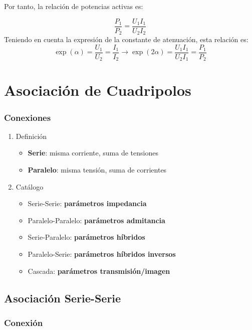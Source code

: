 Por tanto, la relación de potencias activas es:

\[
\frac{P_1}{P_2} = \frac{U_1 I_1}{U_2 I_2}
\]
Teniendo en cuenta la expresión de la constante de atenuación, esta relación es:
\[
    \exp(\alpha) = \frac{U_1}{U_2} = \frac{I_1}{I_2} \rightarrow \boxed{\exp(2\alpha) = \frac{U_1 I_1}{U_2 I_1} = \frac{P_1}{P_2}}
\]

\section{Asociación de Cuadripolos}
\label{sec:org69d0c87}

\subsubsection{Conexiones}
\label{sec:orgf6e2051}

\begin{enumerate}
\item Definición
\label{sec:org531ded7}
\begin{itemize}
\item \textbf{Serie}: misma corriente, suma de tensiones
\item \textbf{Paralelo}: misma tensión, suma de corrientes
\end{itemize}
\item Catálogo
\label{sec:org94028dc}
\begin{itemize}
\item Serie-Serie: \textbf{parámetros impedancia}
\item Paralelo-Paralelo: \textbf{parámetros admitancia}
\item Serie-Paralelo: \textbf{parámetros híbridos}
\item Paralelo-Serie: \textbf{parámetros híbridos inversos}
\item Cascada: \textbf{parámetros transmisión/imagen}
\end{itemize}
\end{enumerate}
\subsection{Asociación Serie-Serie}
\label{sec:orgf8c64c4}

\subsubsection{Conexión}
\label{sec:org93220a5}

